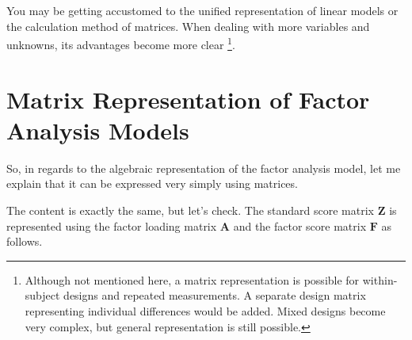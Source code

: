 \documentclass{ltjsbook}
\begin{document}
You may be getting accustomed to the unified representation of linear models or the calculation method of matrices. When dealing with more variables and unknowns, its advantages become more clear \footnote{Although not mentioned here, a matrix representation is possible for within-subject designs and repeated measurements. A separate design matrix representing individual differences would be added. Mixed designs become very complex, but general representation is still possible.}.

\section{Matrix Representation of Factor Analysis Models}
So, in regards to the algebraic representation of the factor analysis model, let me explain that it can be expressed very simply using matrices.

The content is exactly the same, but let's check. The standard score matrix $ \bm {Z} $ is represented using the factor loading matrix $ \bm {A} $ and the factor score matrix $ \bm {F} $ as follows.

\end{document}
